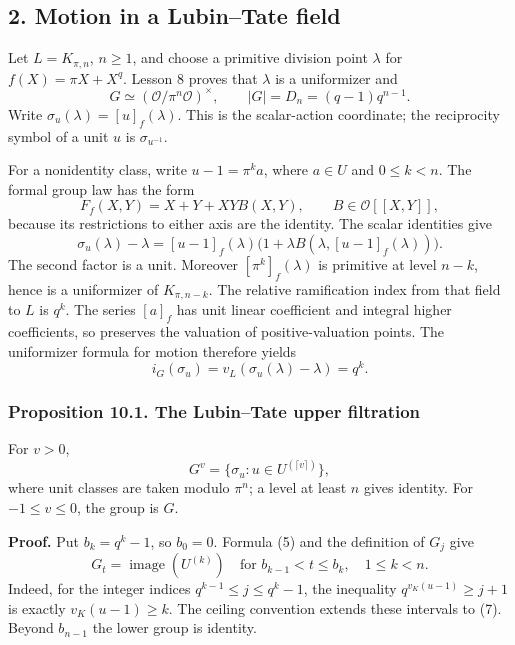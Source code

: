 \documentclass[11pt,a4paper]{article}
\begin{document}
\subsection{2. Motion in a Lubin--Tate
field}\label{motion-in-a-lubintate-field}

Let \(L=K_{\pi,n}\), \(n\geq1\), and choose a primitive division point
\(\lambda\) for \(f(X)=\pi X+X^q\). Lesson 8 proves that \(\lambda\) is
a uniformizer and \[
G\simeq(\mathcal O/\pi^n\mathcal O)^\times,\qquad
|G|=D_n=(q-1)q^{n-1}.
\] Write \(\sigma_u(\lambda)=[u]_f(\lambda)\). This is the scalar-action
coordinate; the reciprocity symbol of a unit \(u\) is
\(\sigma_{u^{-1}}\).

For a nonidentity class, write \(u-1=\pi^k a\), where \(a\in U\) and
\(0\leq k<n\). The formal group law has the form \[
F_f(X,Y)=X+Y+XYB(X,Y),\qquad B\in\mathcal O[[X,Y]],
\] because its restrictions to either axis are the identity. The scalar
identities give \[
\sigma_u(\lambda)-\lambda
 =[u-1]_f(\lambda)\bigl(1+\lambda B(\lambda,[u-1]_f(\lambda))\bigr).
\tag{4}
\] The second factor is a unit. Moreover \([\pi^k]_f(\lambda)\) is
primitive at level \(n-k\), hence is a uniformizer of \(K_{\pi,n-k}\).
The relative ramification index from that field to \(L\) is \(q^k\). The
series \([a]_f\) has unit linear coefficient and integral higher
coefficients, so preserves the valuation of positive-valuation points.
The uniformizer formula for motion therefore yields \[
i_G(\sigma_u)=v_L(\sigma_u(\lambda)-\lambda)=q^k.
\tag{5}
\]

\subsubsection{Proposition 10.1. The Lubin--Tate upper
filtration}\label{proposition-10.1.-the-lubintate-upper-filtration}

For \(v>0\), \[
G^v=\{\sigma_u:u\in U^{(\lceil v\rceil)}\},
\tag{6}
\] where unit classes are taken modulo \(\pi^n\); a level at least \(n\)
gives identity. For \(-1\leq v\leq0\), the group is \(G\).

\textbf{Proof.} Put \(b_k=q^k-1\), so \(b_0=0\). Formula (5) and the
definition of \(G_j\) give \[
G_t=\operatorname{image}(U^{(k)})
\quad\text{for }b_{k-1}<t\leq b_k,\quad 1\leq k<n.
\tag{7}
\] Indeed, for the integer indices \(q^{k-1}\leq j\leq q^k-1\), the
inequality \(q^{v_K(u-1)}\geq j+1\) is exactly \(v_K(u-1)\geq k\). The
ceiling convention extends these intervals to (7). Beyond \(b_{n-1}\)
the lower group is identity.
\end{document}

